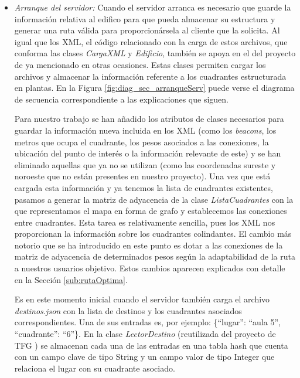 \begin{itemize}
	\item \textit{Arranque del servidor:} Cuando el servidor arranca es necesario que guarde la información relativa al edifico para que pueda almacenar su estructura y generar una ruta válida para proporcionársela al cliente que la solicita. Al igual que los XML, el código relacionado con la carga de estos archivos, que conforma las clases \textit{CargaXML} y \textit{Edificio}, también se apoya en el del proyecto de \cite{TFGguia} ya mencionado en otras ocasiones. Estas clases permiten cargar los archivos y almacenar la información referente a los cuadrantes estructurada en plantas. En la Figura \ref{fig:diag_sec_arranqueServ} puede verse el diagrama de secuencia correspondiente a las explicaciones que siguen.
	
	Para nuestro trabajo se han añadido los atributos de clases necesarios para guardar la información nueva incluida en los XML (como los \textit{beacons}, los metros que ocupa el cuadrante, los pesos asociados a las conexiones, la ubicación del punto de interés o la información relevante de este) y se han eliminado aquellas que ya no se utilizan (como las coordenadas sureste y noroeste que no están presentes en nuestro proyecto). Una vez que está cargada esta información y ya tenemos la lista de cuadrantes existentes, pasamos a generar la matriz de adyacencia de la clase \textit{ListaCuadrantes} con la que representamos el mapa en forma de grafo y establecemos las conexiones entre cuadrantes. Esta tarea es relativamente sencilla, pues los XML nos proporcionan la información sobre los cuadrantes colindantes. El cambio más notorio que se ha introducido en este punto es dotar a las conexiones de la matriz de adyacencia de determinados pesos según la adaptabilidad de la ruta a nuestros usuarios objetivo. Estos cambios aparecen explicados con detalle en la Sección \ref{sub:rutaOptima}. 
	
	Es en este momento inicial cuando el servidor también carga el archivo \textit{destinos.json} con la lista de destinos y los cuadrantes asociados correspondientes. Una de sus entradas es, por ejemplo: \{``lugar'': ``aula 5'', ``cuadrante'': ``6''\}. En la clase \textit{LectorDestino} (reutilizada del proyecto de TFG \citep{TFGguia}) se almacenan cada una de las entradas en una tabla hash que cuenta con un campo clave de tipo String y un campo valor de tipo Integer que relaciona el lugar con su cuadrante asociado. 
	
	
	

\end{itemize}
